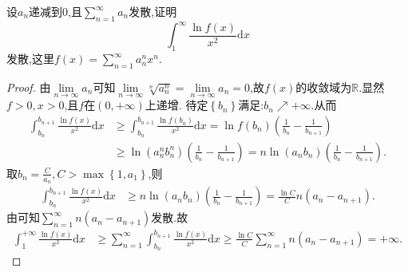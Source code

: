 \documentclass[../../main.tex]{subfiles}%
\begin{document}
\begin{example}
设$a_n$递减到$0$,且$\sum\limits_{n=1}^\infty a_n$发散,证明
$$\int_1^\infty \frac{\ln f(x)}{x^2}\mathrm{d}x$$
发散,这里$f(x)=\sum\limits_{n=1}^\infty a_n^n x^n$.
\end{example}
\begin{proof}

由$\lim\limits_{n\rightarrow \infty}a_n$可知$\lim\limits_{n\rightarrow \infty}\sqrt[n]{a_{n}^{n}}=\lim\limits_{n\rightarrow \infty}a_n=0$,故$f\left( x \right)$的收敛域为$\mathbb{R}$.显然$f>0,x>0$,且$f$在$\left( 0,+\infty \right)$上递增.
待定$\left\{ b_n \right\}$满足:$b_n\nearrow +\infty$.从而
\begin{align*}
\int_{b_n}^{b_{n+1}}{\frac{\ln f\left( x \right)}{x^2}\mathrm{d}x}&\geqslant \int_{b_n}^{b_{n+1}}{\frac{\ln f\left( b_n \right)}{x^2}\mathrm{d}x}=\ln f\left( b_n \right) \left( \frac{1}{b_n}-\frac{1}{b_{n+1}} \right) \\
&\geqslant \ln \left( a_{n}^{n}b_{n}^{n} \right) \left( \frac{1}{b_n}-\frac{1}{b_{n+1}} \right) =n\ln \left( a_nb_n \right) \left( \frac{1}{b_n}-\frac{1}{b_{n+1}} \right) .
\end{align*}
取$b_n=\frac{C}{a_n},C>\max \left\{ 1,a_1 \right\}$,则
\begin{align*}
\int_{b_n}^{b_{n+1}}{\frac{\ln f\left( x \right)}{x^2}\mathrm{d}x}&\geqslant n\ln \left( a_nb_n \right) \left( \frac{1}{b_n}-\frac{1}{b_{n+1}} \right) =\frac{\ln C}{C}n\left( a_n-a_{n+1} \right) .
\end{align*}
由可知$\sum_{n=1}^{\infty}{n\left( a_n-a_{n+1} \right)}$发散.故
\begin{align*}
\int_1^{+\infty}{\frac{\ln f\left( x \right)}{x^2}\mathrm{d}x}&\geqslant \sum_{n=1}^{\infty}{\int_{b_n}^{b_{n+1}}{\frac{\ln f\left( x \right)}{x^2}\mathrm{d}x}}\geqslant \frac{\ln C}{C}\sum_{n=1}^{\infty}{n\left( a_n-a_{n+1} \right)}=+\infty .
\end{align*}

\end{proof}
\end{document}
